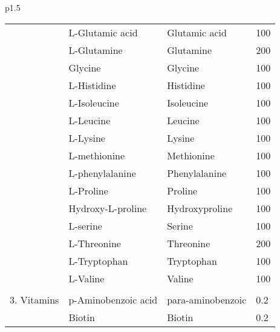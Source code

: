 {\begin{tabular}{p{}}
\begin{tabular}{llll}
		& L-Glutamic acid                     & Glutamic acid                           & 100                  \\
		& L-Glutamine                         & Glutamine                               & 200                  \\
		& Glycine                             & Glycine                                 & 100                  \\
		& L-Histidine                         & Histidine                               & 100                  \\
		& L-Isoleucine                        & Isoleucine                              & 100                  \\
		& L-Leucine                           & Leucine                                 & 100                  \\
		& L-Lysine                            & Lysine                                  & 100                  \\
		& L-methionine                        & Methionine                              & 100                  \\
		& L-phenylalanine                     & Phenylalanine                           & 100                  \\
		& L-Proline                           & Proline                                 & 100                  \\
		& Hydroxy-L-proline                   & Hydroxyproline                          & 100                  \\
		& L-serine                            & Serine                                  & 100                  \\
		& L-Threonine                         & Threonine                               & 200                  \\
		& L-Tryptophan                        & Tryptophan                              & 100                  \\
		& L-Valine                            & Valine                                  & 100                  \\
		&                                     &                                         &                      \\
		3. Vitamins      & p-Aminobenzoic acid                 & para-aminobenzoic                       & 0.2                  \\
		& Biotin                              & Biotin                                  & 0.2                  \\

\end{tabular}
\end{tabular}}
